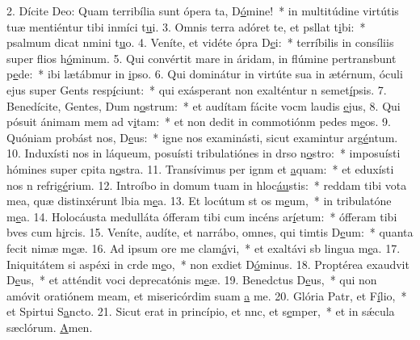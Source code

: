 2. Dícite Deo: Quam terribília sunt ópera ta, D\uline{ó}mine!~* in multitúdine virtútis tuæ mentiéntur tibi inmíci t\uline{u}i.
3. Omnis terra adóret te, et psllat t\uline{i}bi:~* psalmum dicat nmini t\uline{u}o.
4. Veníte, et vidéte ópra D\uline{e}i:~* terríbilis in consíliis super flios h\uline{ó}minum.
5. Qui convértit mare in áridam, in flúmine pertransbunt p\uline{e}de:~* ibi lætábmur in \uline{i}pso.
6. Qui dominátur in virtúte sua in ætérnum, óculi ejus super Gents resp\uline{í}ciunt:~* qui exásperant non exalténtur n semet\uline{í}psis.
7. Benedícite, Gentes, Dum n\uline{o}strum:~* et audítam fácite vocm laudis \uline{e}jus,
8. Qui pósuit ánimam mem ad v\uline{i}tam:~* et non dedit in commotiónm pedes m\uline{e}os.
9. Quóniam probást nos, D\uline{e}us:~* igne nos examinásti, sicut examintur arg\uline{é}ntum.
10. Induxísti nos in láqueum, posuísti tribulatiónes in drso n\uline{o}stro:~* imposuísti hómines super cpita n\uline{o}stra.
11. Transívimus per ignm et \uline{a}quam:~* et eduxísti nos n refrig\uline{é}rium.
12. Introíbo in domum tuam in hloc\uline{áu}stis:~* reddam tibi vota mea, quæ distinxérunt lbia m\uline{e}a.
13. Et locútum st os m\uline{e}um,~* in tribulatóne m\uline{e}a.
14. Holocáusta medulláta ófferam tibi cum incéns ar\uline{í}etum:~* ófferam tibi bves cum h\uline{i}rcis.
15. Veníte, audíte, et narrábo, omnes, qui timtis D\uline{e}um:~* quanta fecit nimæ m\uline{e}æ.
16. Ad ipsum ore me clam\uline{á}vi,~* et exaltávi sb lingua m\uline{e}a.
17. Iniquitátem si aspéxi in crde m\uline{e}o,~* non exdiet D\uline{ó}minus.
18. Proptérea exaudvit D\uline{e}us,~* et atténdit voci deprecatónis m\uline{e}æ.
19. Benedctus D\uline{e}us,~* qui non amóvit oratiónem meam, et misericórdim suam \uline{a} me.
20. Glória Patr, et F\uline{í}lio,~* et Spirtui S\uline{a}ncto.
21. Sicut erat in princípio, et nnc, et s\uline{e}mper,~* et in sǽcula sæclórum. \uline{A}men.
